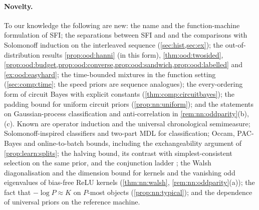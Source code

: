 \paragraph{Novelty.}\label{rem:related:new}
To our knowledge the following are new: the name and the function-machine formulation of SFI; the separations between SFI and \SFIhist{} and the comparisons with Solomonoff induction on the interleaved sequence (\cref{sec:hist,sec:ex}); the out-of-distribution results \cref{prop:ood:hanni} (in this form), \cref{thm:ood:twosided}, \cref{prop:ood:budget,prop:ood:converse,prop:ood:sandwich,prop:ood:labelled} and \cref{ex:ood:easyhard}; the time-bounded mixtures in the function setting (\cref{sec:comp:time}; the speed priors are sequence analogues); the every-ordering form of circuit Bayes with explicit constants (\cref{thm:comp:circuitbayes}); the padding bound for uniform circuit priors (\cref{prop:nn:uniform}); and the statements on Gaussian-process classification and anti-correlation in \cref{rem:nn:oddparity}(b),(c). Known are operator induction and the universal chronological semimeasure; Solomonoff-inspired classifiers and two-part MDL for classification; Occam, PAC-Bayes and online-to-batch bounds, including the exchangeability argument of \cref{prop:learn:splits}; the halving bound, its contrast with simplest-consistent selection on the same prior, and the conjunction ladder \citep{vaintrobhanni2026nnbayes}; the Walsh diagonalisation and the dimension bound for kernels and the vanishing odd eigenvalues of bias-free ReLU kernels (\cref{thm:nn:walsh}, \cref{rem:nn:oddparity}(a)); the fact that $-\log P\approx K$ on $P$-most objects (\cref{prop:nn:typical}); and the dependence of universal priors on the reference machine.
